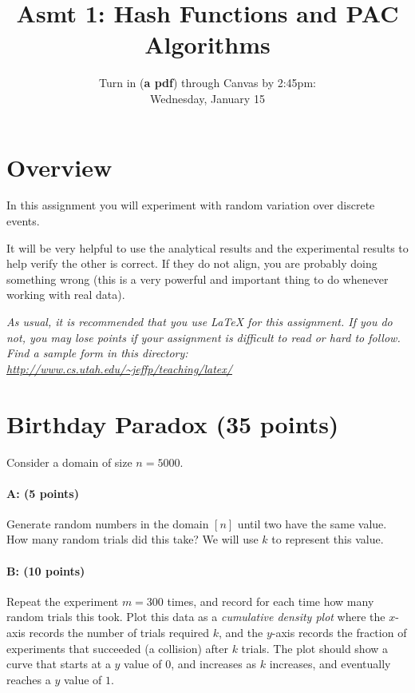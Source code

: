 \documentclass[11pt]{article}
\title{Asmt 1: Hash Functions and PAC Algorithms}
\author{Turn in (\textbf{a pdf}) through Canvas by 2:45pm: \\
Wednesday, January 15}
\date{}
\begin{document}
\maketitle






\section*{Overview}

In this assignment you will experiment with random variation over discrete events.  


It will be very helpful to use the analytical results and the experimental results to help verify the other is correct.  If they do not align, you are probably doing something wrong (this is a very powerful and important thing to do whenever working with real data).  


\vspace{.1in}

\emph{As usual, it is recommended that you use LaTeX for this assignment.  If you do not, you may lose points if your assignment is difficult to read or hard to follow.  Find a sample form in this directory:
\url{http://www.cs.utah.edu/~jeffp/teaching/latex/}}

\section{Birthday Paradox (35 points)}

Consider a domain of size $n = 5000$.  

\paragraph{A: (5 points)}
Generate random numbers in the domain $[n]$ until two have the same value.  How many random trials did this take?  
We will use $k$ to represent this value.  

\paragraph{B: (10 points)}  
Repeat the experiment $m = 300$ times, and record for each time how many random trials this took.  Plot this data as a \emph{cumulative density plot} where the $x$-axis records the number of trials required $k$, and the $y$-axis records the fraction of experiments that succeeded (a collision) after $k$ trials.  The plot should show a curve that starts at a $y$ value of $0$, and increases as $k$ increases, and eventually reaches a $y$ value of $1$.  
\end{document}
